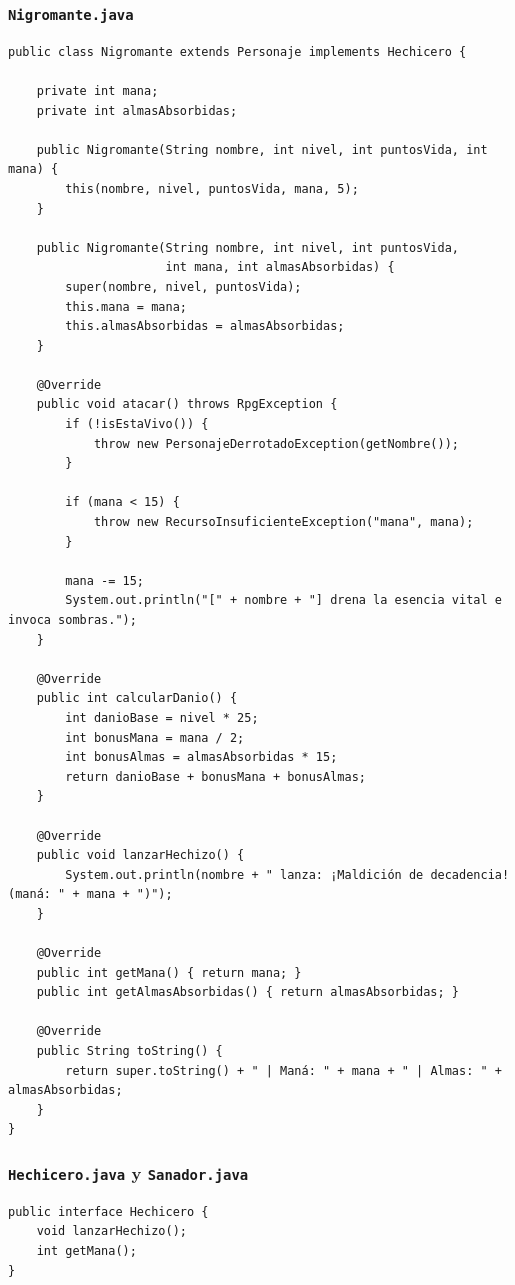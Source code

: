 \documentclass[11pt,letterpaper]{article}
\begin{document}
\subsubsection{\texttt{Nigromante.java}}
\begin{lstlisting}[style=JavaStyle]
public class Nigromante extends Personaje implements Hechicero {

    private int mana;
    private int almasAbsorbidas;

    public Nigromante(String nombre, int nivel, int puntosVida, int mana) {
        this(nombre, nivel, puntosVida, mana, 5);
    }

    public Nigromante(String nombre, int nivel, int puntosVida,
                      int mana, int almasAbsorbidas) {
        super(nombre, nivel, puntosVida);
        this.mana = mana;
        this.almasAbsorbidas = almasAbsorbidas;
    }

    @Override
    public void atacar() throws RpgException {
        if (!isEstaVivo()) {
            throw new PersonajeDerrotadoException(getNombre());
        }

        if (mana < 15) {
            throw new RecursoInsuficienteException("mana", mana);
        }

        mana -= 15;
        System.out.println("[" + nombre + "] drena la esencia vital e invoca sombras.");
    }

    @Override
    public int calcularDanio() {
        int danioBase = nivel * 25;
        int bonusMana = mana / 2;
        int bonusAlmas = almasAbsorbidas * 15;
        return danioBase + bonusMana + bonusAlmas;
    }

    @Override
    public void lanzarHechizo() {
        System.out.println(nombre + " lanza: ¡Maldición de decadencia! (maná: " + mana + ")");
    }

    @Override
    public int getMana() { return mana; }
    public int getAlmasAbsorbidas() { return almasAbsorbidas; }

    @Override
    public String toString() {
        return super.toString() + " | Maná: " + mana + " | Almas: " + almasAbsorbidas;
    }
}
\end{lstlisting}

\subsubsection{\texttt{Hechicero.java} y \texttt{Sanador.java}}
\begin{lstlisting}[style=JavaStyle]
public interface Hechicero {
    void lanzarHechizo();
    int getMana();
}
\end{lstlisting}
\end{document}
